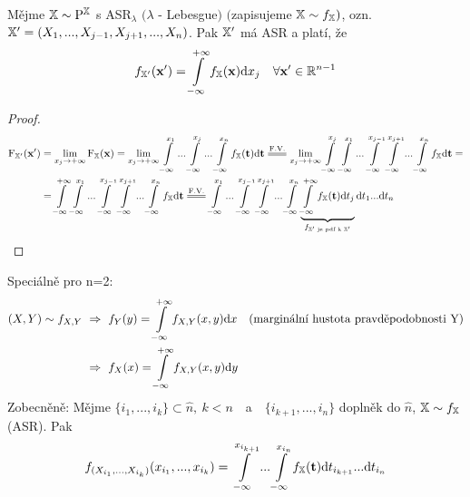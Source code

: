 \begin{theorem}
	Mějme $\mathbb{X}\sim\mathrm{P}^{\mathbb{X}}$ s ASR$_\lambda$ $(\lambda$ - Lebesgue$)$ $($zapisujeme $\mathbb{X}\sim f_{\mathbb{X}})$, ozn.\newline $\mathbb{X}'=(X_1,...,X_{j-1},X_{j+1},...,X_n)$. Pak $\mathbb{X}'$ má ASR a platí, že $$f_{\mathbb{X}'}(\textbf{x}')=\int\limits_{-\infty}^{+\infty}f_{\mathbb{X}}(\textbf{x}) \mathrm{d} x_j~~~\forall \textbf{x}'\in\mathbb{R}^{n-1}$$
	\begin{proof}
		\[
		\begin{split}
		\FF_{\X'}(\textbf{x}')&=\lim\limits_{x_j\to+\infty}\FEX(\textbf{x})=\lim\limits_{x_j\to+\infty}\int\limits_{-\infty}^{x_1}...\int\limits_{-\infty}^{x_j}...\int\limits_{-\infty}^{x_n}\fex(\textbf{t})\dif\textbf{t}\equal{\text{F.V.}}\lim\limits_{x_j\to+\infty}\int\limits_{-\infty}^{x_j}\int\limits_{-\infty}^{x_1}...\int\limits_{-\infty}^{x_{j-1}}\int\limits_{-\infty}^{x_{j+1}}...\int\limits_{-\infty}^{x_n}\fex \dif\textbf{t}= \\ &=\int\limits_{-\infty}^{+\infty}\int\limits_{-\infty}^{x_1}...\int\limits_{-\infty}^{x_{j-1}}\int\limits_{-\infty}^{x_{j+1}}...\int\limits_{-\infty}^{x_n}\fex \dif\textbf{t}\equal{\text{F.V.}}\int\limits_{-\infty}^{x_1}...\int\limits_{-\infty}^{x_{j-1}}\int\limits_{-\infty}^{x_{j+1}}...\int\limits_{-\infty}^{x_n}\underbrace{\int\limits_{-\infty}^{+\infty} \fex(\textbf{t})\dif t_j}_{f_{\X'\text{ je pdf k }\X'}} \dif t_1...\dif t_n
		\end{split}
		\]
	\end{proof}
\end{theorem}
\begin{remark}
Speciálně pro n=2:
	\[
	\begin{split}
	(X,Y)\sim f_{X,Y} &~\Rightarrow~ f_Y(y)=\int\limits_{-\infty}^{+\infty}f_{X,Y}(x,y)\mathrm{d} x ~~~(\text{marginální hustota pravděpodobnosti Y}) \\
	&~\Rightarrow~ f_X(x)=\int\limits_{-\infty}^{+\infty}f_{X,Y}(x,y)\mathrm{d} y 
	\end{split}
	\] 
	Zobecněně:
	Mějme $\{ i_1,...,i_k \} \subset \hat{n},~k<n$~~a~~$\{ i_{k+1},...,i_n \}$ doplněk do $\hat{n}$, $\mathbb{X}\sim f_{\mathbb{X}}$ (ASR). Pak $$f_{(X_{i_1},...,X_{i_k})}(x_{i_1},...,x_{i_k})=\int\limits_{-\infty}^{x_{i_{k+1}}}...\int\limits_{-\infty}^{x_{i_{n}}}f_{\mathbb{X}}(\textbf{t})\mathrm{d} t_{i_{k+1}}...\mathrm{d} t_{i_{n}}$$
\end{remark}
